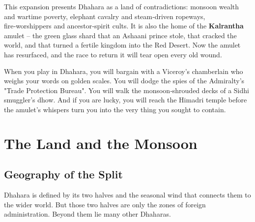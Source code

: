 \documentclass[11pt]{book}
\begin{document}
This expansion presents Dhahara as a land of contradictions: monsoon wealth and wartime poverty, elephant cavalry and steam‑driven ropeways, fire‑worshippers and ancestor‑spirit cults. It is also the home of the \textbf{Kalrantha} amulet -- the green glass shard that an Ashaani prince stole, that cracked the world, and that turned a fertile kingdom into the Red Desert. Now the amulet has resurfaced, and the race to return it will tear open every old wound.

When you play in Dhahara, you will bargain with a Viceroy's chamberlain who weighs your words on golden scales. You will dodge the spies of the Admiralty's "Trade Protection Bureau". You will walk the monsoon‑shrouded decks of a Sidhi smuggler's dhow. And if you are lucky, you will reach the Himadri temple before the amulet's whispers turn you into the very thing you sought to contain.

\clearpage
\chapter{The Land and the Monsoon}

\section{Geography of the Split}

Dhahara is defined by its two halves and the seasonal wind that connects them to the wider world. But those two halves are only the zones of foreign administration. Beyond them lie many other Dhaharas.
\end{document}

